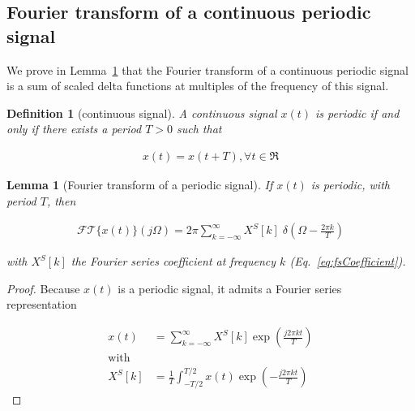 \documentclass[12pt]{article}
\newtheorem{definition}{Definition}
\newtheorem{lemma}{Lemma}
\begin{document}
\pagebreak
\begin{appendices}

\section{Fourier transform of a continuous periodic signal}
\label{sec:ftContPeriodicSignal}

    We prove in Lemma~\ref{lemma:ftContPeriodicSignal} that the Fourier
    transform of a continuous periodic signal is a sum of scaled delta
    functions at multiples of the frequency of this signal.

    \begin{definition}[continuous signal]

        A continuous signal $x(t)$ is periodic if and only if there exists
        a period $T>0$ such that

        \begin{align}
            x(t)=x(t+T), \forall t\in\Re
        \end{align}

        \label{definition:periodicSignal}
    \end{definition}

    \begin{lemma}[Fourier transform of a periodic signal]
        If $x(t)$ is periodic, with period $T$, then

        \begin{align}
            \mathcal{FT}\{x(t)\}(j\Omega)=2\pi\sum_{k=-\infty}^\infty X^S[k]\;\delta\left(\Omega-\frac{2\pi k}{T}\right)\label{eq:ftPeriodic}
         \end{align}

         \noindent with $X^S[k]$ the Fourier series coefficient at frequency $k$ (Eq.~\ref{eq:fsCoefficient}).

         \label{lemma:ftContPeriodicSignal}

    \end{lemma}

    \begin{proof}
        Because $x(t)$ is a periodic signal, it admits a Fourier series
        representation \citep[][Section 2.3]{porat97}

        \begin{align}
            x(t)&=\sum_{k=-\infty}^\infty X^S[k]\exp\left(\frac{j2\pi kt}{T}\right)\label{eq:xFourierSeries}\\
            \text{with}&\nonumber\\
            X^S[k]&=\frac{1}{T}\int_{-T/2}^{T/2}x(t)\exp\left(-\frac{j2\pi kt}{T}\right)\label{eq:fsCoefficient}
        \end{align}


\end{proof}
\end{appendices}
\end{document}
